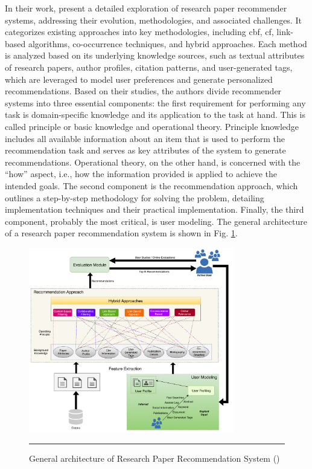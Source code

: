 In their work, \cite{Sharma2023} present a detailed exploration of research paper recommender systems, addressing their evolution, methodologies, and associated challenges.
It categorizes existing approaches into key methodologies, including \gls{cbf}, \gls{cf}, link-based algorithms, co-occurrence techniques, and hybrid approaches.
Each method is analyzed based on its underlying knowledge sources, such as textual attributes of research papers, author profiles, citation patterns, and user-generated tags, which are leveraged to model user preferences and generate personalized recommendations.
Based on their studies, the authors divide recommender systems into three essential components: the first requirement for performing any task is domain-specific knowledge and its application to the task at hand.
This is called principle or basic knowledge and operational theory.
Principle knowledge includes all available information about an item that is used to perform the recommendation task and serves as key attributes of the system to generate recommendations.
Operational theory, on the other hand, is concerned with the ``how'' aspect, i.e., how the information provided is applied to achieve the intended goals.
The second component is the recommendation approach, which outlines a step-by-step methodology for solving the problem, detailing implementation techniques and their practical implementation.
Finally, the third component, probably the most critical, is user modeling.
The general architecture of a research paper recommendation system is shown in Fig. \ref{fig:general-architecture-rprs}.

\begin{figure}[htbp]
    \centering
 \includegraphics[width=0.8\textwidth]{03_Figures/literature-review/general-architecture-rprs.png}
     \rule{35em}{0.5pt}
    \caption{General architecture of Research Paper Recommendation System (\cite{Sharma2023})}
 \label{fig:general-architecture-rprs}
\end{figure}

